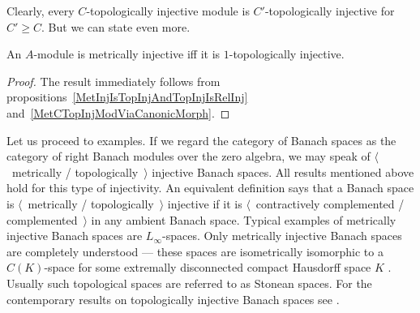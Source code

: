 Clearly, every $C$-topologically injective module is $C'$-topologically 
injective for $C'\geq C$. But we can state even more.

\begin{proposition}\label{MetInjIsOneTopInj} An $A$-module is metrically
injective iff it is $1$-topologically injective.
\end{proposition}
\begin{proof} The result immediately follows 
from propositions~\ref{MetInjIsTopInjAndTopInjIsRelInj} 
and~\ref{MetCTopInjModViaCanonicMorph}.
\end{proof}

Let us proceed to examples. If we regard the category of Banach spaces as the
category of right Banach modules over the zero algebra, we may speak of
$\langle$~metrically / topologically~$\rangle$ injective Banach spaces. All
results mentioned above hold for this type of injectivity. An equivalent
definition says that a Banach space is $\langle$~metrically /
topologically~$\rangle$ injective if it is $\langle$~contractively complemented
/ complemented~$\rangle$ in any ambient Banach space. Typical examples of
metrically injective Banach spaces are $L_\infty$-spaces. Only metrically
injective Banach spaces are completely understood --- these spaces are
isometrically isomorphic to a $C(K)$-space for some extremally disconnected compact
Hausdorff space $K$ \cite[theorem 3.11.6]{LaceyIsomThOfClassicBanSp}. Usually
such topological spaces are referred to as Stonean spaces.  For the contemporary
results on topologically injective Banach spaces see
\cite[chapter 40]{JohnLinHandbookGeomBanSp}.

